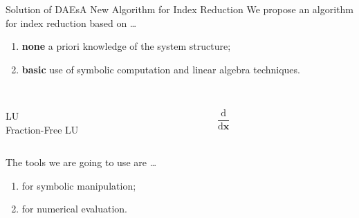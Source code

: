 \begin{frame}{Solution of \aclp{DAE}}{A New Algorithm for Index Reduction}
  We propose an algorithm for index reduction based on \dots
  \begin{enumerate}
    \item \textbf{none} a priori knowledge of the system structure;
    \item \textbf{basic} use of symbolic computation and linear algebra techniques.
  \end{enumerate}
  \vspace{0.5em}
  \begin{columns}
    \centering
    \begin{column}[t]{0.25\textwidth}
      \centering
       \\
      LU \\ Fraction-Free LU
    \end{column}
    \begin{column}[t]{0.25\textwidth}
      \centering
       \\[0.25em]
      $\dfrac{\text{d}}{\text{d}\textbf{x}}$ \vspace*{0.15cm}
    \end{column}
  \end{columns}
  \vspace{0.5em}
  The tools we are going to use are \dots
  \begin{enumerate}
    \item \textbf{\Maple{}} for symbolic manipulation;
    \item \textbf{\Matlab{}} for numerical evaluation.
  \end{enumerate}
\end{frame}

